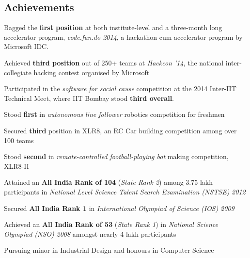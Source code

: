 \documentclass[margin,11pt]{resume}
\begin{document}
\begin{resume}
\vspace{115pt}

\section{\mysidestyle Achievements}
\begin{list2}
\item Bagged the \textbf{first position} at both institute-level and a three-month long accelerator program, \textsl{code.fun.do 2014}, a hackathon cum accelerator program by Microsoft IDC.
\item Achieved \textbf{third position} out of 250+ teams at \textsl{Hackcon '14}, the national inter-collegiate hacking contest organised by Microsoft
\item Participated in the \textsl{software for social cause} competition at the 2014 Inter-IIT Technical Meet, where IIT Bombay stood \textbf{third overall}.
\item Stood \textbf{first} in \textsl{autonomous line follower} robotics competition for freshmen
\item Secured \textbf{third} position in XLR8, an RC Car building competition among over 100 teams
\item Stood \textbf{second} in \textsl{remote-controlled football-playing bot} making competition, XLR8-II
\item Attained an \textbf{All India Rank of 104} (\textsl{State Rank 2}) among 3.75 lakh participants in \textsl{National Level Science Talent Search Examination (NSTSE)} \textsl{2012}
\item Secured \textbf{All India Rank 1} in \textsl{International Olympiad of Science (IOS)} \textsl{2009}
\item Achieved an \textbf{All India Rank of 53} (\textsl{State Rank 1}) in \textsl{National Science Olympiad (NSO)} \textsl{2008} amongst nearly 4 lakh participants
\item Pursuing minor in Industrial Design and honours in Computer Science
\end{list2}


\end{resume}
\end{document}
